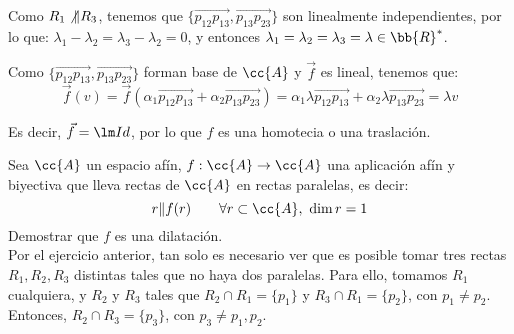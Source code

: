 \begin{ejercicio}
    Como $R_1\not\|R_3$, tenemos que $\{\vec{p_{12}p_{13}}, \vec{p_{13}p_{23}}\}$ son linealmente independientes, por lo que:
    $\lambda_1-\lambda_2 = \lambda_3-\lambda_2 = 0$, y entonces $\lambda_1=\lambda_2=\lambda_3=\lambda \in \bb{R}^\ast$.

    Como $\{\vec{p_{12}p_{13}}, \vec{p_{13}p_{23}}\}$ forman base de $\cc{A}$ y $\vec{f}$ es lineal, tenemos que:
    \begin{equation*}
        \vec{f}(v) = \vec{f}\left(\alpha_1 \vec{p_{12}p_{13}} + \alpha_2 \vec{p_{13}p_{23}}\right)
        = \alpha_1 \lambda \vec{p_{12}p_{13}} + \alpha_2 \lambda \vec{p_{13}p_{23}} = \lambda v
    \end{equation*}

    Es decir, $\vec{f}=\lm Id$, por lo que $f$ es una homotecia o una traslación.
\end{ejercicio}

\begin{ejercicio}
    Sea $\cc{A}$ un espacio afín, $f:\cc{A}\to \cc{A}$ una aplicación afín y biyectiva que lleva rectas de $\cc{A}$ en rectas paralelas, es decir:
    \begin{equation*}
        r\|f(r) \qquad \forall r\subset \cc{A},~ \dim r =1
    \end{equation*}
    Demostrar que $f$ es una dilatación.\\

    Por el ejercicio anterior, tan solo es necesario ver que es posible tomar tres rectas
    $R_1,R_2,R_3$ distintas tales que no haya dos paralelas.
    Para ello, tomamos $R_1$ cualquiera, y $R_2$ y $R_3$ tales que $R_2\cap R_1 = \{p_1\}$ y
    $R_3\cap R_1 = \{p_2\}$, con $p_1\neq p_2$. Entonces, $R_2\cap R_3 = \{p_3\}$, con $p_3\neq p_1,p_2$.
\end{ejercicio}

